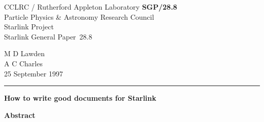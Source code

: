 \documentclass[twoside,11pt]{article}
\newcommand{\stardoccategory}  {Starlink General Paper}
\newcommand{\stardocinitials}  {SGP}
\newcommand{\stardocnumber}    {28.8}
\newcommand{\stardocauthors}   {M D Lawden\\
                                A C Charles}
\newcommand{\stardocdate}      {25 September 1997}
\newcommand{\stardoctitle}     {How to write good documents for Starlink}
\newcommand{\stardocname}{\stardocinitials /\stardocnumber}
\newenvironment{latexonly}{}{}
\begin{document}
\thispagestyle{empty}

\begin{latexonly}
   CCLRC / {\sc Rutherford Appleton Laboratory} \hfill {\bf \stardocname}\\
   {\large Particle Physics \& Astronomy Research Council}\\
   {\large Starlink Project\\}
   {\large \stardoccategory\ \stardocnumber}
   \begin{flushright}
   \stardocauthors\\
   \stardocdate
   \end{flushright}
   \vspace{-4mm}
   \rule{\textwidth}{0.5mm}
   \vspace{5mm}
   \begin{center}
   {\Huge\bf  \stardoctitle \\ [2.5ex]}
   \end{center}
   \vspace{5mm}

   \vspace{10mm}
   \begin{center}
      {\Large\bf Abstract}
   \end{center}
\end{latexonly}
\end{document}
